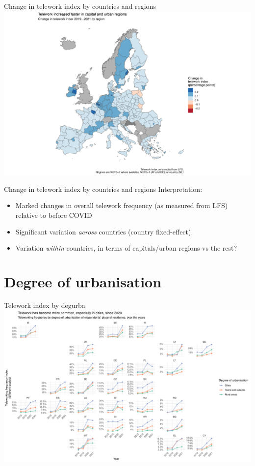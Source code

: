 \documentclass[10pt,handout]{beamer}
\begin{document}
\begin{frame}{Change in telework index by countries and regions}
\centering
\includegraphics[width=\textwidth,height=0.9\textheight,keepaspectratio]{Telework_nuts_change.pdf}
\end{frame}

\begin{frame}{Change in telework index by countries and regions}
Interpretation:
\begin{itemize}
\item Marked changes in overall telework frequency (as measured from LFS) relative to before COVID
\item Significant variation \emph{across} countries (country fixed-effect).
\item Variation \emph{within} countries, in terms of capitals/urban regions vs the rest?
 \end{itemize}
\end{frame}

\section{Degree of urbanisation}
\begin{frame}{Telework index by degurba}
\pause
\centering
\includegraphics[width=\textwidth,height=0.9\textheight,keepaspectratio]{Telework_degurba_eu.pdf}
\end{frame}
\end{document}
